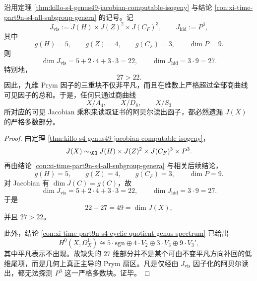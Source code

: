 \begin{theorem}\label{thm:xi-time-part9w-visible-jacobian-deficit-prym-majority}
沿用定理 \ref{thm:killo-s4-genus49-jacobian-computable-isogeny} 与结论 \ref{con:xi-time-part9n-s4-all-subgroup-genera} 的记号。记
\[
J_{\mathrm{vis}}:=J(H)\times J(Z)^2\times J(C_F)^3,
\qquad
J_{\mathrm{hid}}:=P^3,
\]
其中
\[
g(H)=5,\qquad g(Z)=4,\qquad g(C_F)=3,\qquad \dim P=9.
\]
则
\[
\dim J_{\mathrm{vis}}=5+2\cdot 4+3\cdot 3=22,
\qquad
\dim J_{\mathrm{hid}}=3\cdot 9=27.
\]
特别地，
\[
27>22.
\]
因此，九维 Prym 因子的三重块不仅非平凡，而且在维数上严格超过全部商曲线可见因子的总和。于是，任何只通过商曲线
\[
X/A_4,\qquad X/D_8,\qquad X/S_3
\]
所对应的可见 Jacobian 乘积来读取证书的阿贝尔读出函子，都必然遗漏 \(J(X)\) 的严格多数部分。
\end{theorem}
\begin{proof}
由定理 \ref{thm:killo-s4-genus49-jacobian-computable-isogeny}，
\[
J(X)\sim_{\QQ}J(H)\times J(Z)^2\times J(C_F)^3\times P^3.
\]
再由结论 \ref{con:xi-time-part9n-s4-all-subgroup-genera} 与相关后续结论，
\[
g(H)=5,\qquad g(Z)=4,\qquad g(C_F)=3,\qquad \dim P=9.
\]
对 Jacobian 有 \(\dim J(C)=g(C)\)，故
\[
\dim J_{\mathrm{vis}}=5+2\cdot 4+3\cdot 3=22,
\qquad
\dim J_{\mathrm{hid}}=3\cdot 9=27.
\]
于是
\[
22+27=49=\dim J(X),
\]
并且 \(27>22\)。

此外，结论 \ref{con:xi-time-part9n-s4-cyclic-quotient-genus-spectrum} 已给出
\[
H^0(X,\Omega_X^1)\cong
5\cdot \mathrm{sgn}\oplus 4\cdot V_2\oplus 3\cdot V_3\oplus 9\cdot V_3',
\]
其中平凡表示不出现。故缺失的 \(27\) 维部分并不是某个可由不变平凡方向补回的低维尾项，而是几何上真正主导的 Prym 扇区。凡是仅经由 \(J_{\mathrm{vis}}\) 因子化的阿贝尔读出，都无法探测 \(P^3\) 这一严格多数块。证毕。
\end{proof}

